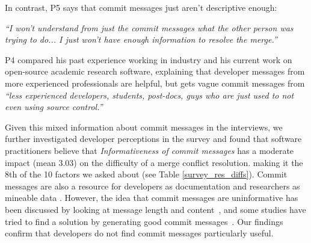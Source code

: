 In contrast, P5 says that commit messages just aren't descriptive enough:
\begin{displayquote}
\textit{``I won't understand from just the commit messages what the other person was trying to do... I just won't have enough information to resolve the merge.''}
\end{displayquote}

P4 compared his past experience working in industry and his current work on open-source academic research software, explaining that developer messages from more experienced professionals are helpful, but gets vague commit messages from \textit{``less experienced developers, students, post-docs, guys who are just used to not even using source control.''}

Given this mixed information about commit messages in the interviews, we further investigated developer perceptions in the survey and found that software practitioners believe that \textit{Informativeness of commit messages} has a moderate impact (mean 3.03) on the difficulty of a merge conflict resolution. making it the 8th  of the 10 factors we asked about (see Table \ref{survey_res_diffs}). Commit messages are also a resource for developers as documentation and researchers as mineable data \cite{d2010commit}. However, the idea that commit messages are uninformative has been discussed by looking at message length and content~\cite{maalej2010can}, and some studies have tried to find a solution by generating good commit messages~\cite{cortes2014}. Our findings confirm that developers do not find commit messages particularly useful.


